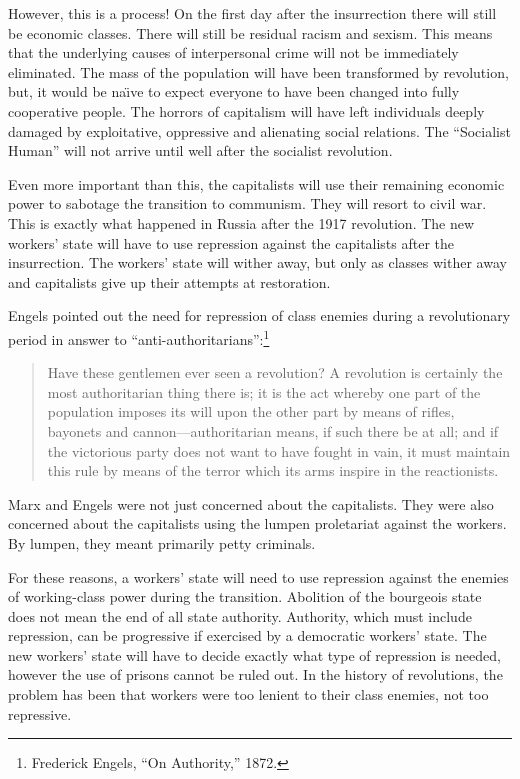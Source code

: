 However, this is a process! On the first day after the insurrection there will still be economic classes. There will still be residual racism and sexism. This means that the underlying causes of interpersonal crime will not be immediately eliminated. The mass of the population will have been transformed by revolution, but, it would be na\"{\i}ve to expect everyone to have been changed into fully cooperative people. The horrors of capitalism will have left individuals deeply damaged by exploitative, oppressive and alienating social relations. The ``Socialist Human'' will not arrive until well after the socialist revolution.

Even more important than this, the capitalists will use their remaining economic power to sabotage the transition to communism. They will resort to civil war. This is exactly what happened in Russia after the 1917 revolution. The new workers' state will have to use repression against the capitalists after the insurrection. The workers' state will wither away, but only as classes wither away and capitalists give up their attempts at restoration.

Engels pointed out the need for repression of class enemies during a revolutionary period in answer to ``anti-authoritarians'':\footnote{Frederick Engels, ``On Authority,'' 1872.}

\blockquote{Have these gentlemen ever seen a revolution? A revolution is certainly the most authoritarian thing there is; it is the act whereby one part of the population imposes its will upon the other part by means of rifles, bayonets and cannon---authoritarian means, if such there be at all; and if the victorious party does not want to have fought in vain, it must maintain this rule by means of the terror which its arms inspire in the reactionists.}

Marx and Engels were not just concerned about the capitalists. They were also concerned about the capitalists using the lumpen proletariat against the workers. By lumpen, they meant primarily petty criminals.

For these reasons, a workers' state will need to use repression against the enemies of working-class power during the transition. Abolition of the bourgeois state does not mean the end of all state authority. Authority, which must include repression, can be progressive if exercised by a democratic workers' state. The new workers' state will have to decide exactly what type of repression is needed, however the use of prisons cannot be ruled out. In the history of revolutions, the problem has been that workers were too lenient to their class enemies, not too repressive.

